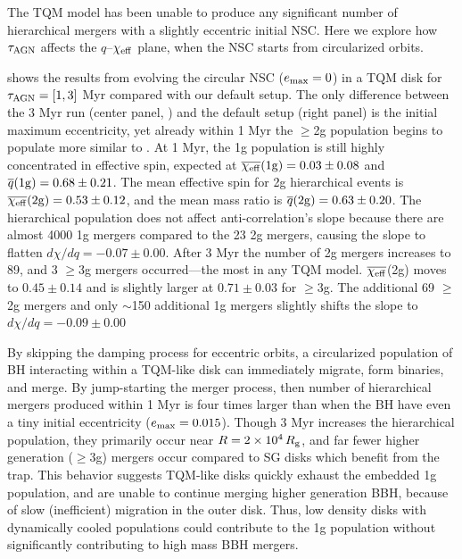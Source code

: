 
The TQM model has been unable to produce any significant number of hierarchical mergers with a slightly eccentric initial NSC.
Here we explore how $\tau_{\rm AGN}$ affects the $q$--$\chi_{\rm eff}$ plane, when the NSC starts from circularized orbits.

 shows the results from evolving the circular NSC ($e_{\rm max}=0$) in a TQM disk for $\tau_{\rm AGN}=[1,3]$ Myr compared with our default setup.
The only difference between the 3 Myr run (center panel, ) and the default setup (right panel) is the initial maximum eccentricity, yet already within 1 Myr the $\geq$2g population begins to populate more similar to .
At 1 Myr, the 1g population is still highly concentrated in effective spin, expected at $\overline{\chi_{\rm eff}}({\rm 1g})=0.03\pm0.08$ and $\overline{q}({\rm 1g})=0.68\pm0.21$.
The mean effective spin for 2g hierarchical events is $\overline{\chi_{\rm eff}}({\rm 2g})=0.53\pm0.12$, and the mean mass ratio is $\overline{q}({\rm 2g})=0.63\pm0.20$.
The hierarchical population does not affect anti-correlation's slope because there are almost 4000 1g mergers compared to the 23 2g mergers, causing the slope to flatten $d\chi/dq=-0.07\pm0.00$.
After 3 Myr the number of 2g mergers increases to 89, and 3 $\geq$3g mergers occurred---the most in any TQM model.
$\overline{\chi_{\rm eff}}$(2g) moves to $0.45\pm0.14$ and is slightly larger at $0.71\pm0.03$ for $\geq$3g.
The additional 69 $\geq$2g mergers and only $\sim$150 additional 1g mergers slightly shifts the slope to $d\chi/dq=-0.09\pm0.00$

By skipping the damping process for eccentric orbits, a circularized population of BH interacting within a TQM-like disk can immediately migrate, form binaries, and merge.
By jump-starting the merger process, then number of hierarchical mergers produced within 1 Myr is four times larger than when the BH have even a tiny initial eccentricity ($e_{\rm max}=0.015$).
Though 3 Myr increases the hierarchical population, they primarily occur near $R=2\times10^4\,R_{\rm g}$, and far fewer higher generation ($\geq 3$g) mergers occur compared to SG disks which benefit from the trap.
This behavior suggests TQM-like disks quickly exhaust the embedded 1g population, and are unable to continue merging higher generation BBH, because of slow (inefficient) migration in the outer disk.
Thus, low density disks with dynamically cooled populations could contribute to the 1g population without significantly contributing to high mass BBH mergers.

